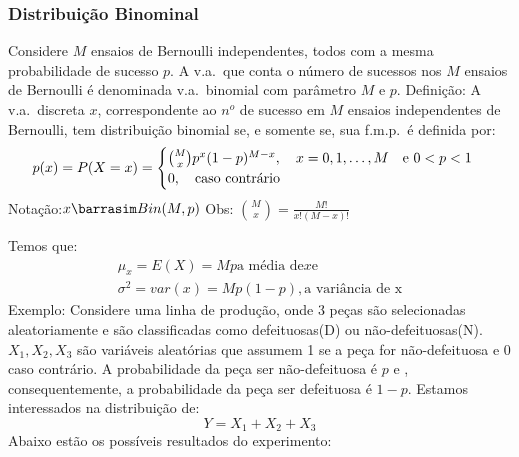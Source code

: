 \documentclass[11pt,a4paper]{book}
\begin{document}
\begin{enumerate}[label=(\alph*)]
\begin{enumerate}
\subsubsection{Distribuição Binominal}
Considere $M$ ensaios de Bernoulli independentes, todos com a mesma probabilidade
de sucesso $p$. A v.a.\ que conta o número de sucessos nos $M$ ensaios de Bernoulli
é denominada v.a.\ binomial com parâmetro $M$ e $p$.
Definição: A v.a.\ discreta $x$, correspondente ao $n^o$ de sucesso em $M$ ensaios
independentes de Bernoulli, tem distribuição binomial se, e somente se, sua 
f.m.p.\ é definida por: 
\begin{align}
  p(x)=P(X=x)=\begin{cases}
    \binom{M}{x}p^x (1-p)^{M-x}, \text{\quad}x=0,1,\dots,M \text{\quad e }0<p<1\\
    0, \text{\quad caso contrário}
  \end{cases}
\end{align}
Notação:$ x \barrasim Bin(M,p)\\$
Obs: $\binom{M}{x}=\frac{M!}{x!(M-x)!}$

Temos que: 
\begin{align}
  \mu_{x}=E(X)=Mp\text{a média de} x \text{e}\\
  \sigma^2 =var(x)=Mp(1-p), \text{a variância de x}
\end{align}
Exemplo: Considere uma linha de produção, onde 3 peças são selecionadas aleatoriamente
e são classificadas como defeituosas(D) ou não-defeituosas(N). $X_{1},X_{2},X_{3}$
são variáveis aleatórias que assumem 1 se a peça for não-defeituosa e 0 caso 
contrário. A probabilidade da peça ser não-defeituosa é $p$ e , consequentemente, 
a probabilidade da peça ser defeituosa é $1-p$. Estamos interessados na distribuição
de:
$$Y=X_{1}+X_{2}+X_{3}$$
Abaixo estão os possíveis resultados do experimento:


\end{enumerate}
\end{enumerate}
\end{document}
